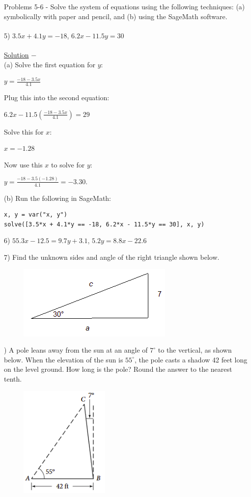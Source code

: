 \documentclass[12pt]{article}
\begin{document}
Problems 5-6 - Solve the system of equations using the following techniques:
(a) symbolically with paper and pencil, and
(b) using the SageMath software. \\ \\
5) $3.5x + 4.1y = -18$, $6.2x - 11.5y = 30$ \\ \\
\underline{Solution} $-$ \\
(a) Solve the first equation for $y$:
\begin{center}
$y = \frac{-18 - 3.5x}{4.1}$
\end{center}
Plug this into the second equation:
\begin{center}
$6.2x - 11.5 \left( \frac{-18 - 3.5x}{4.1} \right) = 29$
\end{center}
Solve this for $x$:
\begin{center}
$x = -1.28$
\end{center}
Now use this $x$ to solve for $y$:
\begin{center}
$y = \frac{-18 - 3.5(-1.28)}{4.1} = -3.30.$
\end{center}
(b) Run the following in SageMath:
\begin{verbatim}
x, y = var("x, y")
solve([3.5*x + 4.1*y == -18, 6.2*x - 11.5*y == 30], x, y)
\end{verbatim}

\pagebreak

6) $55.3x - 12.5 = 9.7y + 3.1$, $5.2y = 8.8x - 22.6$

\pagebreak

7) Find the unknown sides and angle of the right triangle shown below.
\begin{figure}[!h]
\includegraphics[scale=0.8]{figures/rightTriangle.png}
\end{figure}

) A pole leans away from the sun at an angle of $7^\circ$ to the vertical, as shown below.
When the elevation of the sun is $55^\circ$, the pole casts a shadow 42 feet long on the level ground.
How long is the pole?
Round the answer to the nearest tenth.
\begin{figure}[!h]
\includegraphics[scale=0.8]{figures/problem08.png}
\end{figure}
\end{document}
